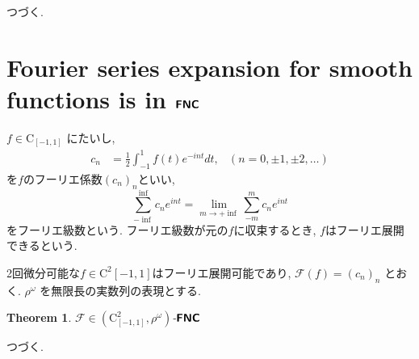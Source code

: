 \documentclass[12pt,a4paper]{article}
\newtheorem{theorem}{Theorem}%
\theoremstyle{definition}
\theoremstyle{remark}
\newcommand{\classtwofont}[1]{\text{\bfseries \sffamily \upshape #1}}
\newcommand{\classFNCtwo}{\classtwofont{FNC}}
\newcommand{\classC}{\mathrm C}
\newcommand{\OpF}{\mathcal{F}}
\begin{document}
つづく.


\section{Fourier series expansion for smooth functions is in $\classFNCtwo$}

$f \in \classC_{[-1, 1]}$ にたいし, 
\begin{align*}
 c_n &= \frac{1}{2} \int^1_{-1} f(t) e^{-int}dt, 
 &
 (n = 0, \pm 1, \pm 2, \dots)
\end{align*}
を$f$のフーリエ係数$(c_n)_n$といい,
\[
 \sum^{\inf}_{-\inf} c_n e^{int} = \lim_{m \to +\inf} \sum^m_{-m} c_n e^{int}
\]
をフーリエ級数という. フーリエ級数が元の$f$に収束するとき, $f$はフーリエ展開できるという.

2回微分可能な$f \in \classC^2{[-1, 1]}$はフーリエ展開可能であり,
$\OpF(f) = (c_n)_n$ とおく.
$\rho^{\omega}$ を無限長の実数列の表現とする.
\begin{theorem}
 $\OpF \in (\classC^2_{[-1,1]}, \rho^{\omega})$-$\classFNCtwo$
\end{theorem}

つづく.
\end{document}
